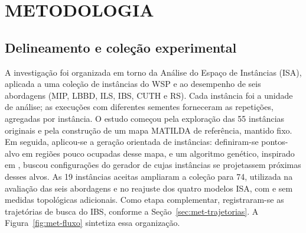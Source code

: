 \chapter{\MakeUppercase{Metodologia}}\label{sec:metodologia}

\section{Delineamento e coleção experimental}\label{sec:met-delineamento}
\label{sec:met-instancias}

A investigação foi organizada em torno da Análise do Espaço de Instâncias
(ISA), aplicada a uma coleção de instâncias do WSP e ao desempenho de seis
abordagens (MIP, LBBD, ILS, IBS, CUTH e RS). Cada instância foi a unidade de
análise; as execuções com diferentes sementes forneceram as repetições,
agregadas por instância. O estudo começou pela exploração das 55 instâncias
originais e pela construção de um mapa MATILDA de referência, mantido fixo.
Em seguida, aplicou-se a geração orientada de instâncias: definiram-se
pontos-alvo em regiões pouco ocupadas desse mapa, e um algoritmo genético,
inspirado em , buscou configurações do gerador
de  cujas instâncias se projetassem próximas
desses alvos. As 19 instâncias aceitas ampliaram a coleção para 74,
utilizada na avaliação das seis abordagens e no reajuste dos quatro modelos ISA,
com e sem medidas topológicas adicionais. Como etapa complementar,
registraram-se as trajetórias de busca do IBS, conforme a
Seção~\ref{sec:met-trajetorias}.
A Figura~\ref{fig:met-fluxo} sintetiza essa organização.

